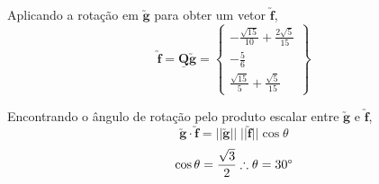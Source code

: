 \begin{enumerate}
    	Aplicando a rotação em $\utilde{\mathbf{g}}$ para obter um vetor $\utilde{\mathbf{f}}$,
    	\[
        	\utilde{\mathbf{f}}
        	=
        	\underline{\mathbf{Q}}\utilde{\mathbf{g}}
        	=
        	\begin{Bmatrix}
        	    -\frac{\sqrt{15}}{10}+\frac{2\sqrt{5}}{15} \\ -\frac{5}{6} \\ \frac{\sqrt{15}}{5}+\frac{\sqrt{5}}{15}
        	\end{Bmatrix}
    	\]
    
    	Encontrando o ângulo de rotação pelo produto escalar entre $\utilde{\mathbf{g}}$ e $\utilde{\mathbf{f}}$,
    	\[\utilde{\mathbf{g}}\cdot\utilde{\mathbf{f}}=||\utilde{\mathbf{g}}||\;||\utilde{\mathbf{f}}||\cos\theta\]
    	\[\cos\theta=\frac{\sqrt{3}}{2}\therefore\theta=\text{30\textdegree}\]
    
\end{enumerate}